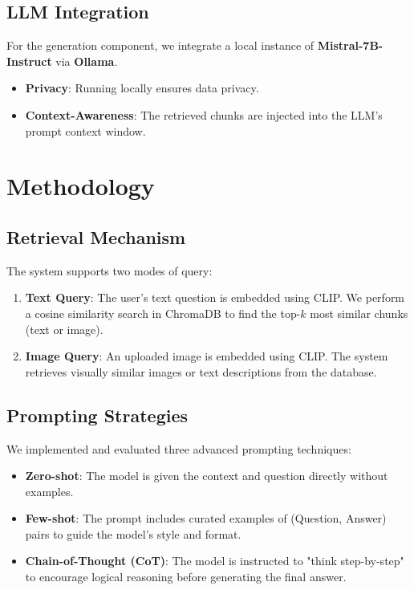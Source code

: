 \documentclass[runningheads]{llncs}
\begin{document}
\subsection{LLM Integration}
For the generation component, we integrate a local instance of \textbf{Mistral-7B-Instruct} via \textbf{Ollama}.
\begin{itemize}
    \item \textbf{Privacy}: Running locally ensures data privacy.
    \item \textbf{Context-Awareness}: The retrieved chunks are injected into the LLM's prompt context window.
\end{itemize}

\section{Methodology}

\subsection{Retrieval Mechanism}
The system supports two modes of query:
\begin{enumerate}
    \item \textbf{Text Query}: The user's text question is embedded using CLIP. We perform a cosine similarity search in ChromaDB to find the top-$k$ most similar chunks (text or image).
    \item \textbf{Image Query}: An uploaded image is embedded using CLIP. The system retrieves visually similar images or text descriptions from the database.
\end{enumerate}

\subsection{Prompting Strategies}
We implemented and evaluated three advanced prompting techniques:
\begin{itemize}
    \item \textbf{Zero-shot}: The model is given the context and question directly without examples.
    \item \textbf{Few-shot}: The prompt includes curated examples of (Question, Answer) pairs to guide the model's style and format.
    \item \textbf{Chain-of-Thought (CoT)}: The model is instructed to "think step-by-step" to encourage logical reasoning before generating the final answer.
\end{itemize}
\end{document}
